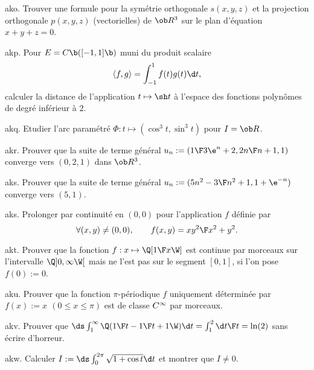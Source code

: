 
\exo [Origin=\Lakedaemon,Level=2,Fight=1,Learn=1,Type=\TravauxDirigés,Field=\Orthonormalisation] ako. 
Trouver une formule pour la symétrie orthogonale $s(x,y,z)$ et la projection orthogonale $p(x,y,z)$ (vectorielles) de $\ob R^3$ sur le plan d'équation $x+y+z=0$. 

\exo [Origin=\Lakedaemon,Level=2,Fight=1,Learn=1,Type=\Exercices,Field=\Orthonormalisation] akp. 
Pour $E=\sc C\b([-1,1]\b)$ muni du produit scalaire 
$$
\langle f,g\rangle=\int_{-1}^1f(t)g(t)\d t,
$$ 
calculer la distance de l'application $t\mapsto \sh t$ à l'espace des fonctions polynômes de degré inférieur à $2$. 

\exo [Origin=\Lakedaemon,Level=2,Fight=1,Learn=1,Type=\Cours,Field=\Courbes] akq. 
Etudier l'arc paramétré $\Phi:t\mapsto(\cos^3t,\sin^3t)$ pour $I=\ob R$. 

\exo [Origin=\Lakedaemon,Level=1,Fight=0,Learn=0,Type=\Cours,Field=\Suites] akr. 
Prouver que la suite de terme général $u_n:=({1\F 3\e^n+2}, {2n\F n+1}, 1)$ converge vers $(0,2,1)$ dans $\ob R^3$. 

\exo [Origin=\Lakedaemon,Level=1,Fight=0,Learn=0,Type=\Cours,Field=\Suites] aks. 
Prouver que la suite de terme général $u_n:=({5n^2-3\F n^2+1},1+\e^{-n})$ converge vers $(5,1)$. 

\exo [Origin=\Lakedaemon,Level=2,Fight=1,Learn=1,Type=\Exercices,Field=\FonctionsDePlusieursVariables] aks. 
Prolonger par continuité en $(0,0)$ pour l'application $f$ définie par 
$$
\forall (x,y)\neq(0,0), \qquad f(x,y)={xy^2\F x^2+y^2}. 
$$

\exo [Origin=\Lakedaemon,Level=2,Fight=0,Learn=0,Type=\Cours,Field=\Fonctions] akt. 
Prouver que la fonction $f:x\mapsto \Q[{1\F x}\W]$ est continue par morceaux sur l'intervalle $\Q]0, \infty\W[$ mais ne l'est pas sur le segment $[0, 1]$, si l'on pose $f(0):=0$.  

\exo [Origin=\Lakedaemon,Level=2,Fight=0,Learn=0,Type=\Cours,Field=\Fonctions] aku. 
Prouver que la fonction $\pi$-périodique $f$ uniquement déterminée par $f(x):=x\ \,(0\le x\le \pi)$ est de classe $\sc C^\infty$ par morceaux.  

\exo [Origin=\Lakedaemon,Level=2,Fight=1,Learn=1,Type=\Exercices,Field=\IntégralesGénéralisées] akv. 
Prouver que $\ds \int_1^\infty\Q({1\F t}-{1\F t+1}\W)\d t=\int_1^2{\d t\F t}=\ln(2)$ sans écrire d'horreur. 

\exo [Origin=\Lakedaemon,Level=2,Fight=1,Learn=1,Type=\Exercices,Field=\IntégralesGénéralisées] akw. 
Calculer $I:=\ds\int_0^{2\pi}\sqrt{1+\cos t}\d t$ et montrer que $I\neq 0$. 

